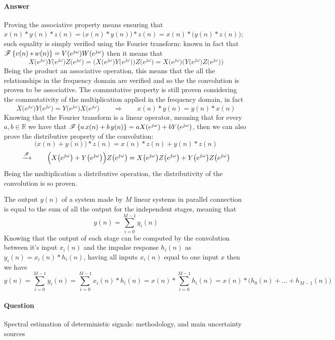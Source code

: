 	\paragraph{Answer} Proving the associative property means ensuring that $x(n)*y(n)*z(n) = \big(x(n)*y(n)\big)*z(n) = x(n) * \big( y(n) * z(n) \big)$; such equality is simply verified using the Fourier transform: known in fact that $\mathscr{F}\left\{ v(n)* w(n) \right\} = V(e^{j\omega}) W(e^{j\omega})$ then it means that
	\[ X\big(e^{j\omega}\big) Y\big(e^{j\omega}\big) Z\big(e^{j\omega}\big) = \Big(X\big(e^{j\omega}\big) Y\big(e^{j\omega}\big)\Big) Z\big(e^{j\omega}\big) = X \big(e^{j\omega}\big) \Big(Y\big(e^{j\omega}\big)Z\big(e^{j\omega}\big)\Big) \]
	Being the product an associative operation, this means that the all the relationships in the frequency domain are verified and so the the convolution is proven to be associative. The commutative property is still proven considering the commutativity of the multiplication applied in the frequency domain, in fact
	\[ X\big(e^{j\omega}\big) Y \big(e^{j\omega}\big) = Y\big(e^{j\omega}\big) X\big(e^{j\omega}\big) \qquad \Rightarrow \qquad x(n)*y(n) = y(n)*x(n) \]
	Knowing that the Fourier transform is a linear operator, meaning that for every $a,b\in \mathds R$ we have that $\mathscr{F}\left\{ a\, x(n) + b\,y(n) \right\} = aX(e^{j\omega}) + bY(e^{j\omega})$, then we can also prove the distributive property of the convolution:
	\[ \big(x(n) + y(n)\big)* z(n) = x(n)*z(n) + y(n)*z(n) \]\[ \xrightarrow{\mathscr F} \qquad \Big( X\big(e^{j\omega}\big) + Y\big(e^{j\omega}\big)\Big) Z\big(e^{j\omega}\big) = X\big(e^{j\omega}\big)Z\big(e^{j\omega}\big) + Y\big(e^{j\omega}\big)Z\big(e^{j\omega}\big)  \]
	Being the multiplication a distributive operation, the distributivity of the convolution is so proven.
	
	The output $y(n)$ of a system made by $M$ linear systems in parallel connection is equal to the sum of all the output for the independent stages, meaning that
	\[ y(n) = \sum_{i=0}^{M-1} y_i(n) \]
	Knowing that the output of each stage can be computed by the convolution between it's input $x_i(n)$ and the impulse response $h_i(n)$ as $y_i(n) = x_i(n)*h_i(n)$, having all inputs $x_i(n)$ equal to one input $x$ then we have 
	\[ y(n) = \sum_{i=0}^{M-1} y_i(n) = \sum_{i=0}^{M-1} x_i(n)*h_i(n) = x(n) * \sum_{i=0}^{M-1} h_i(n) = x(n) * \Big(h_0(n) + \dots + h_{M-1}(n)\Big)\]
	
\newquestion
	\paragraph{Question} Spectral estimation of deterministic signals: methodology, and main uncertainty sources
	
